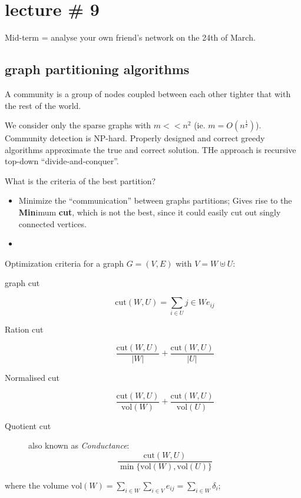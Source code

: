 \documentclass[a4paper]{article}
\begin{document}



\section{lecture \# 9} %
\label{sec:lecture_9}

Mid-term = analyse your own friend's network on the 24th of March.

\subsection{graph partitioning algorithms} %
\label{sub:graph_partitioning_algorithms}

A community is a group of nodes coupled between each other tighter that with the rest of the world.

We consider only the sparse graphs with $m<<n^2$ (ie. $m = O(n^\frac{1}{2})$). Community detection is NP-hard.
Properly designed and correct greedy algorithms approximate the true and correct solution. THe approach is recursive top-down ``divide-and-conquer''.

What is the criteria of the best partition?\begin{itemize}
	\item Minimize the ``communication'' between graphs partitions; Gives rise to the \textbf{Min}imum \textbf{cut}, which is not the best, since it could easily cut out singly connected vertices.
	\item 
\end{itemize}

Optimization criteria for a graph $G=(V,E)$ with $V = W\uplus U$:
\begin{description}
	\item[graph cut] \[\text{cut}(W, U) = \sum_{i\in U}{j \in W}e_{ij}\]
	\item[Ration cut] \[\frac{\text{cut}(W, U)}{|W|}  + \frac{\text{cut}(W, U)}{|U|} \]
	\item[Normalised cut] \[\frac{\text{cut}(W, U)}{\text{vol}(W)}  + \frac{\text{cut}(W, U)}{\text{vol}(U)} \]
	\item[Quotient cut] also known as \emph{Conductance}: \[\frac{\text{cut}(W, U)}{\min\big\{\text{vol}(W),\text{vol}(U)\big\}} \]
\end{description}
where the volume $\text{vol}(W) = \sum_{i\in W} \sum_{i\in V} e_{ij} = \sum_{i\in W} \delta_i$;
\end{document}
